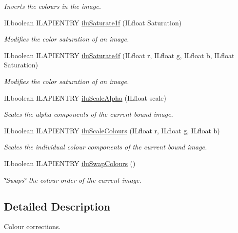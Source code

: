 \begin{DoxyCompactItemize}
\begin{DoxyCompactList}\small\item\em Inverts the colours in the image. \end{DoxyCompactList}\item 
I\+Lboolean I\+L\+A\+P\+I\+E\+N\+T\+R\+Y \hyperlink{group__ilu__colour_gaa8f7b3bdc21492fddac12dd823051c3b}{ilu\+Saturate1f} (I\+Lfloat Saturation)
\begin{DoxyCompactList}\small\item\em Modifies the color saturation of an image. \end{DoxyCompactList}\item 
I\+Lboolean I\+L\+A\+P\+I\+E\+N\+T\+R\+Y \hyperlink{group__ilu__colour_gac117ee194f9075d2600f147e08a59251}{ilu\+Saturate4f} (I\+Lfloat r, I\+Lfloat g, I\+Lfloat b, I\+Lfloat Saturation)
\begin{DoxyCompactList}\small\item\em Modifies the color saturation of an image. \end{DoxyCompactList}\item 
I\+Lboolean I\+L\+A\+P\+I\+E\+N\+T\+R\+Y \hyperlink{group__ilu__colour_ga12f99569c175ef8b6f26c7713703380c}{ilu\+Scale\+Alpha} (I\+Lfloat scale)
\begin{DoxyCompactList}\small\item\em Scales the alpha components of the current bound image. \end{DoxyCompactList}\item 
I\+Lboolean I\+L\+A\+P\+I\+E\+N\+T\+R\+Y \hyperlink{group__ilu__colour_ga59c222c85f299a8bf12206dfd86646b8}{ilu\+Scale\+Colours} (I\+Lfloat r, I\+Lfloat g, I\+Lfloat b)
\begin{DoxyCompactList}\small\item\em Scales the individual colour components of the current bound image. \end{DoxyCompactList}\item 
I\+Lboolean I\+L\+A\+P\+I\+E\+N\+T\+R\+Y \hyperlink{group__ilu__colour_gad18047843d546f50472e0f0af80f2ad8}{ilu\+Swap\+Colours} ()
\begin{DoxyCompactList}\small\item\em \char`\"{}\+Swaps\char`\"{} the colour order of the current image. \end{DoxyCompactList}\end{DoxyCompactItemize}


\subsection{Detailed Description}
Colour corrections. 

